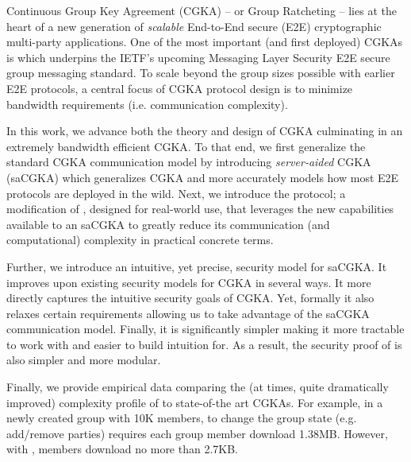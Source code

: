 
Continuous Group Key Agreement (CGKA) -- or Group Ratcheting -- lies at the
heart of a new generation of \emph{scalable} End-to-End secure (E2E)
cryptographic multi-party applications. One of the most important (and first
deployed) CGKAs is \protITK which underpins the IETF's upcoming Messaging
Layer Security E2E secure group messaging standard. To scale beyond the group
sizes possible with earlier E2E protocols, a central focus of CGKA protocol
design is to minimize bandwidth requirements (i.e. communication
complexity).

In this work, we advance both the theory and design of CGKA culminating in
an extremely bandwidth efficient CGKA. To that end, we first generalize
the standard CGKA communication model by introducing \emph{server-aided} CGKA
(saCGKA) which generalizes CGKA and more accurately models how most E2E protocols are deployed in
the wild. Next, we introduce the \saik protocol; a modification of \protITK,
designed for real-world use, that leverages the new capabilities available to
an saCGKA to greatly reduce its communication (and computational) complexity
in practical concrete terms.

Further, we introduce an intuitive, yet precise, security model for saCGKA.
It improves upon existing security models for CGKA in several ways. It more
directly captures the intuitive security goals of CGKA. Yet, formally it also
relaxes certain requirements allowing us to take advantage of the saCGKA
communication model. Finally, it is significantly simpler making it more
tractable to work with and easier to build intuition for. As a result, the
security proof of \saik is also simpler and more modular.

Finally, we provide empirical data comparing the (at times, quite
dramatically improved) complexity profile of \saik to state-of-the art CGKAs.
For example, in a newly created group with 10K members, to change the group
state (e.g. add/remove parties) \protITK requires each group member download
1.38MB. However, with \saik, members download no more than 2.7KB.

